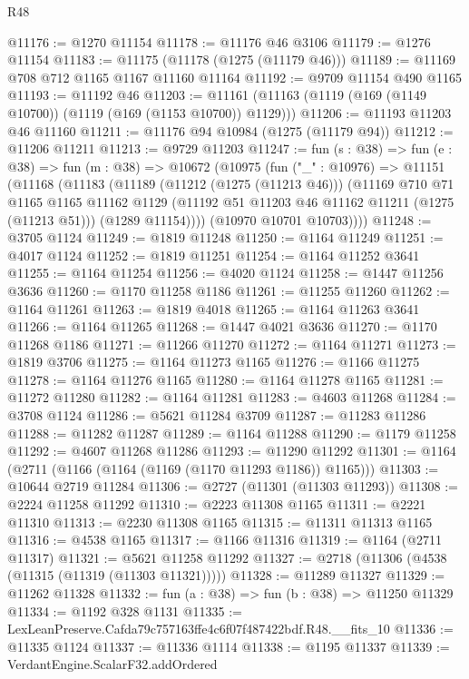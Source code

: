 \begin{lexlean}{R48}
\begin{coremodule}
@11176 := @1270 @11154
@11178 := @11176 @46 @3106
@11179 := @1276 @11154
@11183 := @11175 (@11178 (@1275 (@11179 @46)))
@11189 := @11169 @708 @712 @1165 @1167 @11160 @11164
@11192 := @9709 @11154 @490 @1165
@11193 := @11192 @46
@11203 := @11161 (@11163 (@1119 (@169 (@1149 @10700)) (@1119 (@169 (@1153 @10700)) @1129)))
@11206 := @11193 @11203 @46 @11160
@11211 := @11176 @94 @10984 (@1275 (@11179 @94))
@11212 := @11206 @11211
@11213 := @9729 @11203
@11247 := fun (s : @38) =>
  fun (e : @38) =>
  fun (m : @38) =>
  @10672
    (@10975
      (fun ("_" : @10976) =>
      @11151
        (@11168
          (@11183
            (@11189
              (@11212 (@1275 (@11213 @46)))
              (@11169
                @710
                @71
                @1165
                @1165
                @11162
                @1129
                (@11192 @51 @11203 @46 @11162 @11211 (@1275 (@11213 @51)))
                (@1289 @11154))))
          (@10970 @10701 @10703))))
@11248 := @3705 @1124
@11249 := @1819 @11248
@11250 := @1164 @11249
@11251 := @4017 @1124
@11252 := @1819 @11251
@11254 := @1164 @11252 @3641
@11255 := @1164 @11254
@11256 := @4020 @1124
@11258 := @1447 @11256 @3636
@11260 := @1170 @11258 @1186
@11261 := @11255 @11260
@11262 := @1164 @11261
@11263 := @1819 @4018
@11265 := @1164 @11263 @3641
@11266 := @1164 @11265
@11268 := @1447 @4021 @3636
@11270 := @1170 @11268 @1186
@11271 := @11266 @11270
@11272 := @1164 @11271
@11273 := @1819 @3706
@11275 := @1164 @11273 @1165
@11276 := @1166 @11275
@11278 := @1164 @11276 @1165
@11280 := @1164 @11278 @1165
@11281 := @11272 @11280
@11282 := @1164 @11281
@11283 := @4603 @11268
@11284 := @3708 @1124
@11286 := @5621 @11284 @3709
@11287 := @11283 @11286
@11288 := @11282 @11287
@11289 := @1164 @11288
@11290 := @1179 @11258
@11292 := @4607 @11268 @11286
@11293 := @11290 @11292
@11301 := @1164 (@2711 (@1166 (@1164 (@1169 (@1170 @11293 @1186)) @1165)))
@11303 := @10644 @2719 @11284
@11306 := @2727 (@11301 (@11303 @11293))
@11308 := @2224 @11258 @11292
@11310 := @2223 @11308 @1165
@11311 := @2221 @11310
@11313 := @2230 @11308 @1165
@11315 := @11311 @11313 @1165
@11316 := @4538 @1165
@11317 := @1166 @11316
@11319 := @1164 (@2711 @11317)
@11321 := @5621 @11258 @11292
@11327 := @2718 (@11306 (@4538 (@11315 (@11319 (@11303 @11321)))))
@11328 := @11289 @11327
@11329 := @11262 @11328
@11332 := fun (a : @38) => fun (b : @38) => @11250 @11329
@11334 := @1192 @328 @1131
@11335 := LexLeanPreserve.Cafda79c757163ffe4c6f07f487422bdf.R48.__fits_10
@11336 := @11335 @1124
@11337 := @11336 @1114
@11338 := @1195 @11337
@11339 := VerdantEngine.ScalarF32.addOrdered

\end{coremodule}
\end{lexlean}
